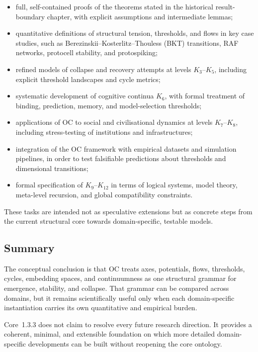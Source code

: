 \begin{itemize}
    \item full, self-contained proofs of the theorems stated in the historical result-boundary chapter, with explicit assumptions and intermediate lemmas;
    \item quantitative definitions of structural tension, thresholds, and flows in key case studies, such as Berezinskii--Kosterlitz--Thouless (BKT) transitions, RAF networks, protocell stability, and protospiking;
    \item refined models of collapse and recovery attempts at levels \(K_3\)--\(K_5\), including explicit threshold landscapes and cycle metrics;
    \item systematic development of cognitive continua \(K_6\), with formal treatment of binding, prediction, memory, and model-selection thresholds;
    \item applications of OC to social and civilisational dynamics at levels \(K_7\)--\(K_{8}\), including stress-testing of institutions and infrastructures;
    \item integration of the OC framework with empirical datasets and simulation pipelines, in order to test falsifiable predictions about thresholds and dimensional transitions;
    \item formal specification of \(K_9\)--\(K_{12}\) in terms of logical systems, model theory, meta-level recursion, and global compatibility constraints.
\end{itemize}

These tasks are intended not as speculative extensions but as concrete steps from the current structural core towards domain-specific, testable models.

\subsection{Summary}

The conceptual conclusion is that OC treats axes, potentials, flows,
thresholds, cycles, embedding spaces, and continuumness as one structural
grammar for emergence, stability, and collapse. That grammar can be compared
across domains, but it remains scientifically useful only when each
domain-specific instantiation carries its own quantitative and empirical burden.

Core~1.3.3 does not claim to resolve every future research direction. It provides a
coherent, minimal, and extensible foundation on which more detailed
domain-specific developments can be built without reopening the core ontology.
